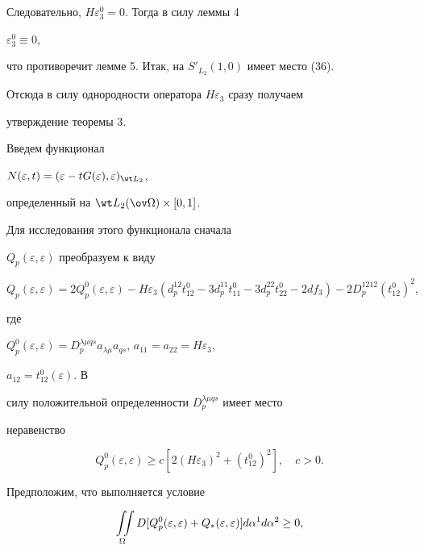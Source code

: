 Следовательно, $H\varepsilon^0_3=0$. Тогда в силу леммы 4\; 


$\varepsilon^0_3\equiv 0$, 


что противоречит лемме 5. Итак, на $S'_{L_2}(1,0)$ имеет место (36). 


Отсюда в силу однородности оператора $H\varepsilon_3$ сразу получаем 


утверждение теоремы 3. 


 


Введем функционал 


$N(\varepsilon,t)=(\varepsilon-t G(\varepsilon), 


\varepsilon)_{\wt L_2}$, 


определенный на $\wt L_2(\ov\Omega)\times[0,1]$. 


Для исследования этого функционала сначала 


$Q_p(\varepsilon,\varepsilon)$ преобразуем к виду 


\begin{equation} 


Q_p(\varepsilon,\varepsilon)=2Q^0_p(\varepsilon,\varepsilon)- 


H\varepsilon_3(d^{12}_p t^0_{12}-3d^{11}_p t^0_{11}- 


3d^{22}_p t^0_{22}-2d f_3)- 


2D^{1212}_p(t^0_{12})^2, 


\end{equation} 


где 


$Q^0_p(\varepsilon,\varepsilon)=D^{\lambda\mu qs}_p 


a_{\lambda\mu}a_{qs}$, $a_{11}=a_{22}=H\varepsilon_3$, 


$a_{12}=t^0_{12}(\varepsilon)$. В 


силу положительной определенности $D^{\lambda\mu qs}_p$ имеет место 


неравенство 


\begin{equation} 


Q^0_p(\varepsilon,\varepsilon)\ge c 


[2(H\varepsilon_3)^2+(t^0_{12})^2],\quad c>0. 


\end{equation} 


Предположим, что выполняется условие 


\begin{equation} 


\intO D[Q^0_p(\varepsilon,\varepsilon)+ 


Q_*(\varepsilon,\varepsilon)]d\alpha^1d\alpha^2\ge 0, 


\end{equation} 


